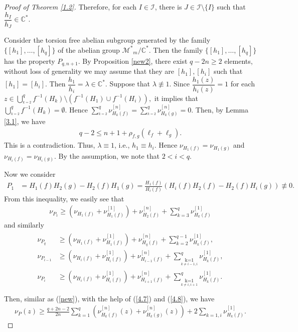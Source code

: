 \documentclass[12pt, a4paper, oneside]{amsart}
\def\overset#1#2{{\mathrel{\mathop {{#2}_{}}\limits^{#1}}}}
\def\underset#1#2{{\mathrel{\mathop {{}_{} {#2}}\limits_{{#1}_{}}}}}
\newcommand{\C}{{\mathbb{C}}}
\numberwithin{equation}{section}
\begin{document}
\begin{proof}[Proof of Theorem \ref{1.2}]
Therefore, for each $I\in \mathcal {I}$, there is $J\in \mathcal {I}\setminus \{I\}$ such that  $\dfrac {h_I}{h_J}\in\C^*.$

Consider the torsion free abelian subgroup generated by the family 
$\{[h_1] ,\ldots, [h_{q}]\}$ of the abelian group $\mathcal {M^*}_m/ \C^*.$ 
Then the family $\{[h_1],\ldots,[h_{q}]\}$ has the property $P_{q,n+1}$. 
By Proposition \ref{new2}, there exist $q-2n\ge 2$ elements, without loss of generality 
we may assume that they are  $[h_1],[h_i]$  such that $[h_1]=[h_i].$ Then
$\dfrac {h_1}{h_i}=\lambda\in\C^*.$
Suppose that $\lambda\not\equiv 1.$ Since $\dfrac{h_1(z)}{h_i(z)}=1$ for each $z\in\bigcup_{\overset{k=2}{k\ne i}}^{q}f^{-1}(H_k)\setminus(f^{-1}(H_1)\cup f^{-1}(H_i)),$ 
it implies that  $\bigcup_{\overset{k=2}{k\ne i}}^{q}f^{-1}(H_k)=\emptyset$. Hence $\sum_{\overset{k=2}{k\ne i}}^{q}\nu_{H_k(f)}^{[n]}=\sum_{\overset{k=2}{k\ne i}}^{q}\nu_{H_k(g)}^{[n]}=0$. Then, by Lemma \ref{3.1}, we have
\begin{align*} 
q-2\le n+1+\rho_{f,g}(\ell_f+\ell_g).
\end{align*}
This is a contradiction. Thus, $\lambda\equiv 1$, i.e., $h_1\equiv h_i$. Hence $\nu_{H_1(f)}=\nu_{H_1(g)}$ and
$\nu_{H_i(f)}=\nu_{H_i(g)}$. By the assumption, we note that $2<i<q$.

Now we consider 
\begin{align*}
P_{1}&=H_1(f)H_{2}(g)-H_{2}(f)H_1(g)=\frac{H_1(f)}{H_i(f)}\left (H_i(f)H_{2}(f)-H_{2}(f)H_i(g)\right )\not\equiv 0.
\end{align*}
From this inequality, we easily see that
\begin{align}\label{4.7}
\nu_{P_1}\ge (\nu_{H_1(f)}+\nu_{H_1(f)}^{[1]})+\nu_{H_2(f)}^{[n]}+\sum_{k=3}^{q}\nu_{H_k(f)}^{[1]}
\end{align}
and similarly
\begin{align}\label{4.8}
\begin{split}
\nu_{P_q}&\ge (\nu_{H_1(f)}+\nu_{H_1(f)}^{[1]})+\nu_{H_q(f)}^{[n]}+\sum_{k=2}^{q-1}\nu_{H_k(f)}^{[1]},\\
\nu_{P_{i-1}}&\ge (\nu_{H_i(f)}+\nu_{H_i(f)}^{[1]})+\nu_{H_{i-1}(f)}^{[n]}+\sum_{\underset{k\ne i-1,i}{k=1}}^q\nu_{H_k(f)}^{[1]},\\
\nu_{P_{i}}&\ge (\nu_{H_i(f)}+\nu_{H_i(f)}^{[1]})+\nu_{H_{i+1}(f)}^{[n]}+\sum_{\underset{k\ne i,i+1}{k=1}}^q\nu_{H_k(f)}^{[1]}.\\
\end{split}
\end{align}
Then, similar as (\ref{new}), with the help of (\ref{4.7}) and (\ref{4.8}), we have
\begin{align}\label{5.6}
\nu_P(z) \ge\frac{q+2n-2}{2n}\sum_{k=1}^{q}\left (\nu_{H_k(f)}^{[n]}(z)+\nu_{H_k(g)}^{[n]}(z)\right )+2\sum_{k=1,i}\nu_{H_k(f)}^{[1]}.
\end{align}


\end{proof}
\end{document}
